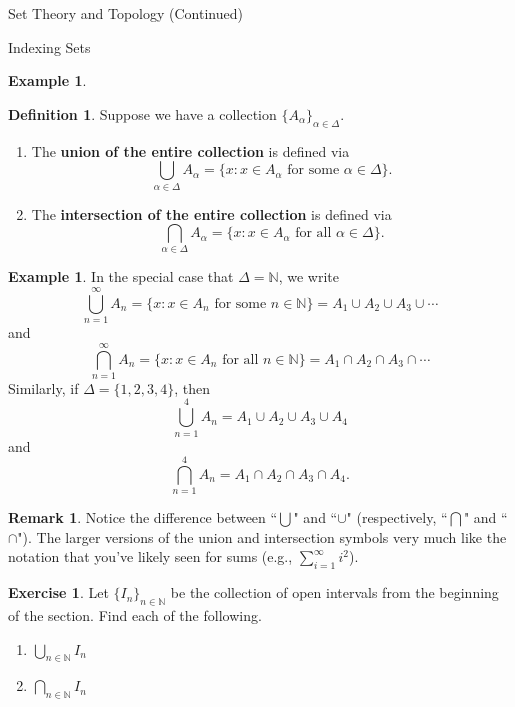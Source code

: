\documentclass[11pt]{article}
\theoremstyle{definition}
\newtheorem{definition}[theorem]{Definition}
\newtheorem{example}[theorem]{Example}
\newtheorem{exercise}[theorem]{Exercise}
\newtheorem{remark}[theorem]{Remark}
\begin{document}
\begin{section}{Set Theory and Topology (Continued)}
\begin{subsection}{Indexing Sets}
\begin{example}
\begin{enumerate}
\end{enumerate}
\end{example}

\begin{definition}
Suppose we have a collection $\{A_{\alpha}\}_{\alpha\in\Delta}$.

\begin{enumerate}
\item The \textbf{union of the entire collection} is defined via
\[
\bigcup_{\alpha\in\Delta} A_{\alpha}=\{x:x\in A_{\alpha} \mbox{ for some }\alpha\in \Delta\}.
\]

\item The \textbf{intersection of the entire collection} is defined via
\[
\bigcap_{\alpha\in\Delta} A_{\alpha}=\{x:x\in A_{\alpha} \mbox{ for all }\alpha\in \Delta\}.
\]

\end{enumerate}
\end{definition}

\begin{example} 
In the special case that $\Delta=\mathbb{N}$, we write
\[
\bigcup_{n=1}^{\infty}A_n= \{ x : x \in A_n \mbox{ for some } n \in \mathbb{N}\}= A_1\cup A_2 \cup A_3 \cup \cdots
\] 
and
\[
\bigcap_{n=1}^{\infty}A_n= \{ x : x \in A_n \mbox{ for all } n \in \mathbb{N}\} = A_1\cap A_2 \cap A_3 \cap \cdots
\] 
Similarly, if $\Delta=\{1,2,3,4\}$, then
\[
\bigcup_{n=1}^{4}A_n= A_1\cup A_2 \cup A_3 \cup A_4
\] 
and
\[
\bigcap_{n=1}^{4}A_n= A_1\cap A_2 \cap A_3 \cap A_4.
\] 
\end{example}

\begin{remark}
Notice the difference between ``$\bigcup$" and ``$\cup$" (respectively, ``$\bigcap$" and ``$\cap$").  The larger versions of the union and intersection symbols very much like the notation that you've likely seen for sums (e.g., $\displaystyle \sum_{i=1}^\infty i^2$).
\end{remark}

\begin{exercise}
Let $\{I_n\}_{n\in\mathbb{N}}$ be the collection of open intervals from the beginning of the section.  Find each of the following.
\begin{enumerate}
\item $\displaystyle \bigcup_{n\in\mathbb{N}}I_n$
\item $\displaystyle \bigcap_{n\in\mathbb{N}}I_n$
\end{enumerate}
\end{exercise}


\end{subsection}
\end{section}
\end{document}
